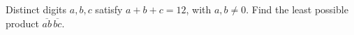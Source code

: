 Distinct digits $a,b,c$ satisfy $a+b+c=12$, with $a,b\ne0$. Find the least possible product $\overline{ab}\,\overline{bc}$.
